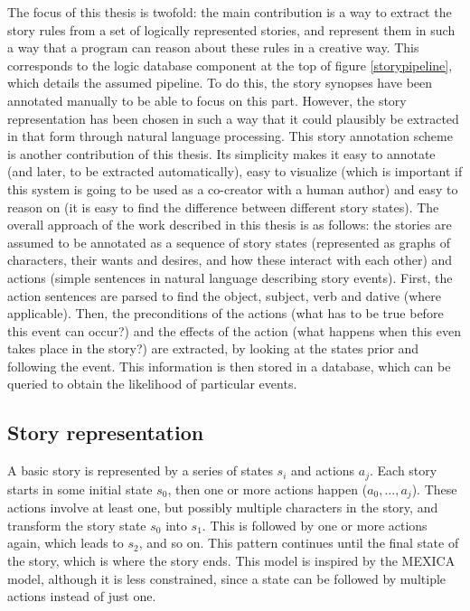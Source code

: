 The focus of this thesis is twofold: the main contribution is a way to extract
the story rules from a set of logically represented stories, and represent them 
in such a way that a program can reason about these rules in a creative way. 
This corresponds to the logic database component at the top
of figure \ref{storypipeline}, which details the assumed pipeline. To do this, the story synopses have been
annotated manually to be able to focus on this part. However, the story
representation has been chosen in such a way that it could plausibly be extracted
in that form through natural language processing. 
This story annotation scheme is another contribution of this thesis. Its
simplicity makes it easy to annotate (and later, to be extracted automatically),
easy to visualize (which is important if this system is going to be used as a
co-creator with a human author) and easy to reason on (it is easy to find the
difference between different story states).
The overall approach of the work described in this thesis is as follows: the
stories are assumed to be annotated as a sequence of story states (represented
as graphs of characters, their wants and desires, and how these interact with
each other) and actions (simple sentences in natural language describing story
events). First, the action sentences are parsed to find the object, subject,
verb and dative (where applicable). Then, the preconditions of the actions (what
has to be true before this event can occur?) and the effects of the action (what
happens when this even takes place in the story?) are extracted, by looking at
the states prior and following the event. This information is then stored in a
database, which can be queried to obtain the likelihood of particular events.

\subsection{Story representation}

A basic story is represented by a series of states $s_i$ and actions $a_j$.
Each story starts in some initial state $s_0$, then one or more actions happen
($a_0, ..., a_j$). These actions involve at least one, but
possibly multiple characters in the story, and transform the story state $s_0$
into $s_1$. This is followed by one or more actions
again, which leads to $s_2$, and so on. This pattern continues until the final 
state of the story, which is where the story ends. This model is inspired by the
MEXICA model, although it is less constrained, since a state can be followed by
multiple actions instead of just one.


